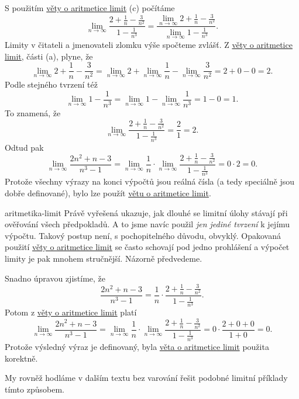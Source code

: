 \begin{probsol}
 S použitím \hyperref[thm:aritmetika-limit]{věty o aritmetice limit} (c)
 počítáme
 \[
  \lim_{n \to \infty} \frac{2 + \frac{1}{n} - \frac{3}{n^2}}{1 - \frac{1}{n^3}}
  = \frac{\lim_{n \to \infty} 2 + \frac{1}{n} - \frac{3}{n^2}}{\lim_{n \to
  \infty} 1 - \frac{1}{n^3}}.
 \]
 Limity v čitateli a jmenovateli zlomku výše spočteme zvlášť. Z
 \hyperref[thm:aritmetika-limit]{věty o aritmetice limit}, části (a), plyne, že
 \[
  \lim_{n \to \infty} 2 + \frac{1}{n} - \frac{3}{n^2} = \lim_{n \to \infty} 2 +
  \lim_{n \to \infty} \frac{1}{n} - \lim_{n \to \infty} \frac{3}{n^2} = 2 + 0 -
  0 = 2.
 \]
 Podle stejného tvrzení též
 \[
  \lim_{n \to \infty} 1 - \frac{1}{n^3} = \lim_{n \to \infty} 1 - \lim_{n \to
  \infty} \frac{1}{n^3} = 1 - 0 = 1.
 \]
 To znamená, že
 \[
  \lim_{n \to \infty} \frac{2 + \frac{1}{n} - \frac{3}{n^2}}{1 - \frac{1}{n^3}}
  = \frac{2}{1} = 2.
 \]
 Odtud pak
 \[
  \lim_{n \to \infty} \frac{2n^2 + n - 3}{n^3 - 1} = \lim_{n \to \infty}
  \frac{1}{n} \cdot \lim_{n \to \infty} \frac{2 + \frac{1}{n} - \frac{3}{n^2}}{1
  - \frac{1}{n^3}} = 0 \cdot 2 = 0.
 \]
 Protože všechny výrazy na konci výpočtů jsou reálná čísla (a tedy speciálně jsou
 dobře definované), bylo lze použít \hyperref[thm:aritmetika-limit]{větu o
 aritmetice limit}.
\end{probsol}

\begin{remark}{}{aritmetika-limit}
 Právě vyřešená  ukazuje, jak dlouhé se
 limitní úlohy stávají při ověřování všech předpokladů. A to jsme navíc použil
 \emph{jen jediné tvrzení} k jejímu výpočtu. Takový postup není, s
 pochopitelného důvodu, obvyklý. Opakovaná použití
 \hyperref[thm:aritmetika-limit]{věty o aritmetice limit} se často schovají pod
 jedno prohlášení a výpočet limity je pak mnohem stručnější. Názorně předvedeme.

 Snadno úpravou zjistíme, že
 \[
  \frac{2n^2 + n - 3}{n^3 - 1} = \frac{1}{n} \cdot \frac{2 + \frac{1}{n} -
  \frac{3}{n^2}}{1 - \frac{1}{n^3}}.
 \]
 Potom z \hyperref[thm:aritmetika-limit]{věty o aritmetice limit} platí
 \[
  \lim_{n \to \infty} \frac{2n^2 + n - 3}{n^3 - 1} = \lim_{n \to \infty}
  \frac{1}{n} \cdot \lim_{n \to \infty} \frac{2 + \frac{1}{n} - \frac{3}{n^2}}{1
  - \frac{1}{n^3}} = 0 \cdot \frac{2 + 0 + 0}{1 + 0} = 0.
 \]
 Protože výsledný výraz je definovaný, byla \hyperref[thm:aritmetika-limit]{věta
 o aritmetice limit} použita korektně.

 My rovněž hodláme v dalším textu bez varování řešit podobné limitní příklady
 tímto  způsobem.
\end{remark}

